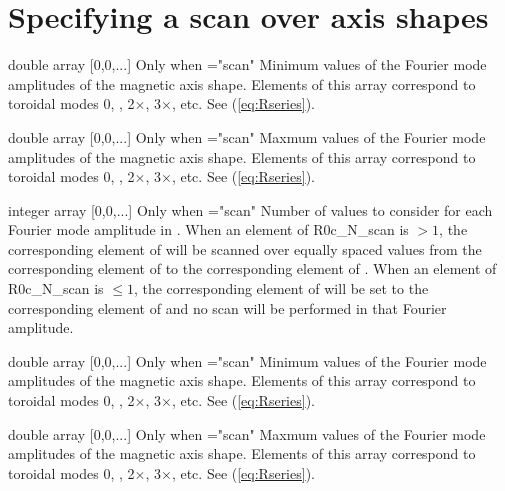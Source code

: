 \myhrule


\section{Specifying a scan over axis shapes}

{double array}
{[0,0,...]}
{Only when ={\ttfamily "scan"}}
{Minimum values of the Fourier mode amplitudes of the magnetic axis shape. Elements of this array correspond to toroidal modes 0, , 2$\times$, 3$\times$, etc.  See (\ref{eq:Rseries}).
}

\myhrule

{double array}
{[0,0,...]}
{Only when ={\ttfamily "scan"}}
{Maxmum values of the Fourier mode amplitudes of the magnetic axis shape. Elements of this array correspond to toroidal modes 0, , 2$\times$, 3$\times$, etc.  See (\ref{eq:Rseries}).
}

\myhrule

{integer array}
{[0,0,...]}
{Only when ={\ttfamily "scan"}}
{Number of values to consider for each Fourier mode amplitude in . When an element of {\ttfamily R0c\_N\_scan} is $>1$, the corresponding element of  will be scanned over equally spaced values from the corresponding element of  to the corresponding element of .  When an element of {\ttfamily R0c\_N\_scan} is $\le 1$, the corresponding element of  will be set to the corresponding element of  and no scan will be performed in that Fourier amplitude.
}

\myhrule

{double array}
{[0,0,...]}
{Only when ={\ttfamily "scan"}}
{Minimum values of the Fourier mode amplitudes of the magnetic axis shape. Elements of this array correspond to toroidal modes 0, , 2$\times$, 3$\times$, etc.  See (\ref{eq:Rseries}).
}

\myhrule

{double array}
{[0,0,...]}
{Only when ={\ttfamily "scan"}}
{Maxmum values of the Fourier mode amplitudes of the magnetic axis shape. Elements of this array correspond to toroidal modes 0, , 2$\times$, 3$\times$, etc.  See (\ref{eq:Rseries}).
}

